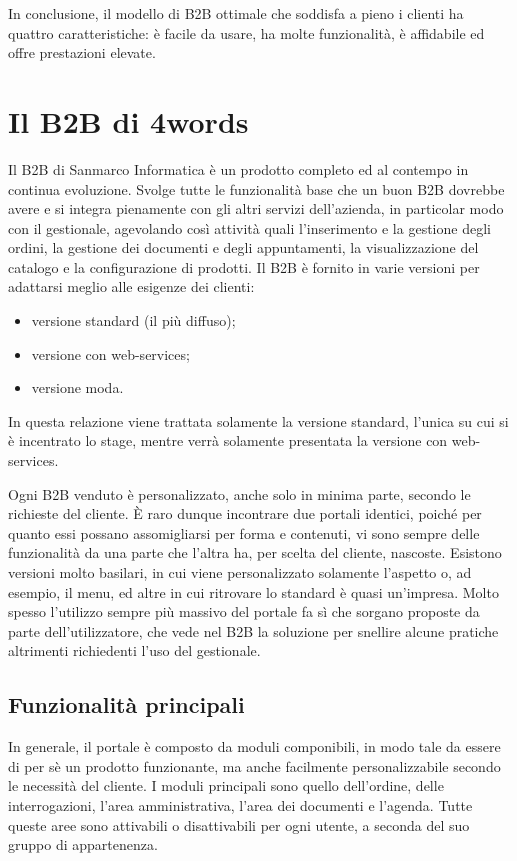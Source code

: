 In conclusione, il modello di B2B ottimale che soddisfa a pieno i clienti ha quattro caratteristiche: è facile da usare, ha molte funzionalità, è affidabile ed offre prestazioni elevate.

\section{Il B2B di 4words}
Il B2B di Sanmarco Informatica è un prodotto completo ed al contempo in continua evoluzione. Svolge tutte le funzionalità base che un buon B2B dovrebbe avere e si integra pienamente con gli altri servizi dell'azienda, in particolar modo con il gestionale, agevolando così attività quali l'inserimento e la gestione degli ordini, la gestione dei documenti e degli appuntamenti, la visualizzazione del catalogo e la configurazione di prodotti. Il B2B è fornito in varie versioni per adattarsi meglio alle esigenze dei clienti:
\begin{itemize}
	\item versione standard (il più diffuso);
	\item versione con web-services;
	\item versione moda.
\end{itemize}
In questa relazione viene trattata solamente la versione standard, l'unica su cui si è incentrato lo stage, mentre verrà solamente presentata la versione con web-services.

Ogni B2B venduto è personalizzato, anche solo in minima parte, secondo le richieste del cliente. È raro dunque incontrare due portali identici, poiché per quanto essi possano assomigliarsi per forma e contenuti, vi sono sempre delle funzionalità da una parte che l'altra ha, per scelta del cliente, nascoste.
Esistono versioni molto basilari, in cui viene personalizzato solamente l'aspetto o, ad esempio, il menu, ed altre in cui ritrovare lo standard è quasi un'impresa. Molto spesso l'utilizzo sempre più massivo del portale fa sì che sorgano proposte da parte dell'utilizzatore, che vede nel B2B la soluzione per snellire alcune pratiche altrimenti richiedenti l'uso del gestionale.

\subsection{Funzionalità principali}
In generale, il portale è composto da moduli componibili, in modo tale da essere di per sè un prodotto funzionante, ma anche facilmente personalizzabile secondo le necessità del cliente. I moduli principali sono quello dell'ordine, delle interrogazioni, l'area amministrativa, l'area dei documenti e l'agenda. Tutte queste aree sono attivabili o disattivabili per ogni utente, a seconda del suo gruppo di appartenenza. 

